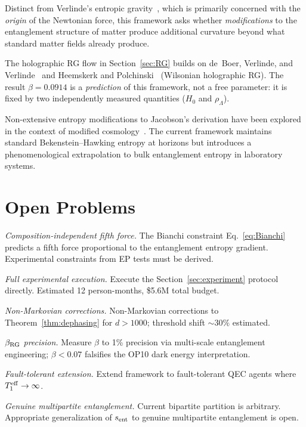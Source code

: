 \documentclass[12pt]{article}
\begin{document}
Distinct from Verlinde's entropic gravity~\cite{Verlinde2011}, which is primarily
concerned with the \emph{origin} of the Newtonian force, this framework asks whether
\emph{modifications} to the entanglement structure of matter produce additional curvature
beyond what standard matter fields already produce.

The holographic RG flow in Section~\ref{sec:RG} builds on
de~Boer, Verlinde, and Verlinde~\cite{deBoer2000} and
Heemskerk and Polchinski~\cite{Heemskerk2011} (Wilsonian holographic RG). The
result $\beta = 0.0914$ is a \emph{prediction} of this framework, not a free parameter:
it is fixed by two independently measured quantities ($H_0$ and $\rho_\Lambda$).

Non-extensive entropy modifications to Jacobson's derivation have been explored in
the context of modified cosmology~\cite{Tsallis2013}. The current framework maintains
standard Bekenstein--Hawking entropy at horizons but introduces a phenomenological
extrapolation to bulk entanglement entropy in laboratory systems.

\section{Open Problems}
\label{sec:open}

\begin{description}[leftmargin=1.8em,labelindent=0em]
\item[\textbf{OP8.}] \textit{Composition-independent fifth force.} The Bianchi
constraint Eq.~\eqref{eq:Bianchi} predicts a fifth force proportional to the entanglement
entropy gradient. Experimental constraints from EP tests must be derived.

\item[\textbf{OP11.}] \textit{Full experimental execution.} Execute the Section~\ref{sec:experiment}
protocol directly. Estimated 12 person-months, \$5.6M total budget.

\item[\textbf{OP12.}] \textit{Non-Markovian corrections.} Non-Markovian corrections to
Theorem~\ref{thm:dephasing} for $d > 1000$; threshold shift $\sim 30\%$ estimated.

\item[\textbf{OP13.}] \textit{$\beta_{\rm RG}$ precision.} Measure $\beta$ to 1\%
precision via multi-scale entanglement engineering; $\beta < 0.07$ falsifies the OP10
dark energy interpretation.

\item[\textbf{OP14.}] \textit{Fault-tolerant extension.} Extend framework to
fault-tolerant QEC agents where $T_1^{\rm eff}\to\infty$.

\item[\textbf{OP15.}] \textit{Genuine multipartite entanglement.} Current bipartite
partition is arbitrary. Appropriate generalization of $s_{\rm ent}$ to genuine
multipartite entanglement is open.
\end{description}
\end{document}
